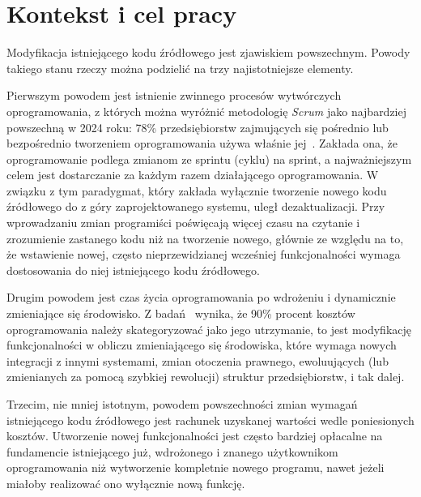 \section{Kontekst i cel pracy}


Modyfikacja istniejącego kodu źródłowego jest zjawiskiem powszechnym.
Powody takiego stanu rzeczy można podzielić na trzy najistotniejsze elementy.

Pierwszym powodem jest istnienie zwinnego procesów wytwórczych oprogramowania, z
których można wyróżnić metodologię \textit{Scrum} jako najbardziej powszechną
w 2024 roku: 78\% przedsiębiorstw zajmujących się pośrednio lub bezpośrednio
tworzeniem oprogramowania używa właśnie jej~\cite{pwc_agile_report}.
Zakłada ona, że oprogramowanie podlega zmianom ze sprintu (cyklu) na sprint,
a najważniejszym celem jest dostarczanie za każdym razem działającego
oprogramowania.
W związku z tym paradygmat, który zakłada wyłącznie tworzenie nowego kodu
źródłowego do z góry zaprojektowanego systemu, uległ dezaktualizacji.
Przy wprowadzaniu zmian programiści poświęcają więcej czasu na czytanie
i zrozumienie zastanego kodu niż na tworzenie nowego, głównie
ze względu na to, że wstawienie nowej, często nieprzewidzianej wcześniej
funkcjonalności wymaga dostosowania do niej istniejącego kodu źródłowego.


Drugim powodem jest czas życia oprogramowania po wdrożeniu i dynamicznie
zmieniające się środowisko.
Z badań~\cite{dehaghani2013factors} wynika, że 90\% procent kosztów oprogramowania
należy skategoryzować jako jego utrzymanie, to jest modyfikację funkcjonalności
w obliczu zmieniającego się środowiska, które wymaga nowych integracji z innymi
systemami, zmian otoczenia prawnego, ewoluujących (lub zmienianych za pomocą
szybkiej rewolucji) struktur przedsiębiorstw, i tak dalej.

Trzecim, nie mniej istotnym, powodem powszechności zmian wymagań istniejącego
kodu źródłowego jest rachunek uzyskanej wartości wedle poniesionych kosztów.
Utworzenie nowej funkcjonalności jest często bardziej opłacalne na fundamencie
istniejącego już, wdrożonego i znanego użytkownikom oprogramowania niż
wytworzenie kompletnie nowego programu, nawet jeżeli miałoby realizować ono
wyłącznie nową funkcję.

